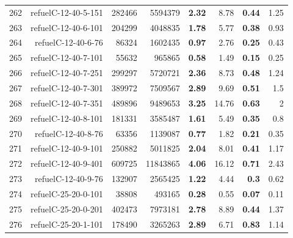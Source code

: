 \begin{longtable}{lrr@{\hskip 12pt}r@{\hskip 12pt}r@{\hskip 12pt}r@{\hskip 12pt}r@{\hskip 12pt}r}
262 & \multirow{1}{*}{refuelC-12-40-5-151} & \multirow{1}{*}{282466} & \multirow{1}{*}{5594379} & \textbf{2.32} & 8.78 & \textbf{0.44} & 1.25 \\
263 & \multirow{1}{*}{refuelC-12-40-6-101} & \multirow{1}{*}{204299} & \multirow{1}{*}{4048835} & \textbf{1.78} & 5.77 & \textbf{0.38} & 0.93 \\
264 & \multirow{1}{*}{refuelC-12-40-6-76} & \multirow{1}{*}{86324} & \multirow{1}{*}{1602435} & \textbf{0.97} & 2.76 & \textbf{0.25} & 0.43 \\
265 & \multirow{1}{*}{refuelC-12-40-7-101} & \multirow{1}{*}{55632} & \multirow{1}{*}{965865} & \textbf{0.58} & 1.49 & \textbf{0.15} & 0.25 \\
266 & \multirow{1}{*}{refuelC-12-40-7-251} & \multirow{1}{*}{299297} & \multirow{1}{*}{5720721} & \textbf{2.36} & 8.73 & \textbf{0.48} & 1.24 \\
267 & \multirow{1}{*}{refuelC-12-40-7-301} & \multirow{1}{*}{389972} & \multirow{1}{*}{7509567} & \textbf{2.89} & 9.69 & \textbf{0.51} & 1.5 \\
268 & \multirow{1}{*}{refuelC-12-40-7-351} & \multirow{1}{*}{489896} & \multirow{1}{*}{9489653} & \textbf{3.25} & 14.76 & \textbf{0.63} & 2 \\
269 & \multirow{1}{*}{refuelC-12-40-8-101} & \multirow{1}{*}{181331} & \multirow{1}{*}{3585487} & \textbf{1.61} & 5.49 & \textbf{0.35} & 0.8 \\
270 & \multirow{1}{*}{refuelC-12-40-8-76} & \multirow{1}{*}{63356} & \multirow{1}{*}{1139087} & \textbf{0.77} & 1.82 & \textbf{0.21} & 0.35 \\
271 & \multirow{1}{*}{refuelC-12-40-9-101} & \multirow{1}{*}{250882} & \multirow{1}{*}{5011825} & \textbf{2.04} & 8.01 & \textbf{0.41} & 1.17 \\
272 & \multirow{1}{*}{refuelC-12-40-9-401} & \multirow{1}{*}{609725} & \multirow{1}{*}{11843865} & \textbf{4.06} & 16.12 & \textbf{0.71} & 2.43 \\
273 & \multirow{1}{*}{refuelC-12-40-9-76} & \multirow{1}{*}{132907} & \multirow{1}{*}{2565425} & \textbf{1.22} & 4.44 & \textbf{0.3} & 0.62 \\
274 & \multirow{1}{*}{refuelC-25-20-0-101} & \multirow{1}{*}{38808} & \multirow{1}{*}{493165} & \textbf{0.28} & 0.55 & \textbf{0.07} & 0.11 \\
275 & \multirow{1}{*}{refuelC-25-20-0-201} & \multirow{1}{*}{402473} & \multirow{1}{*}{7973181} & \textbf{2.78} & 8.89 & \textbf{0.44} & 1.37 \\
276 & \multirow{1}{*}{refuelC-25-20-1-101} & \multirow{1}{*}{178490} & \multirow{1}{*}{3265263} & \textbf{2.89} & 6.71 & \textbf{0.83} & 1.14 \\

\end{longtable}
